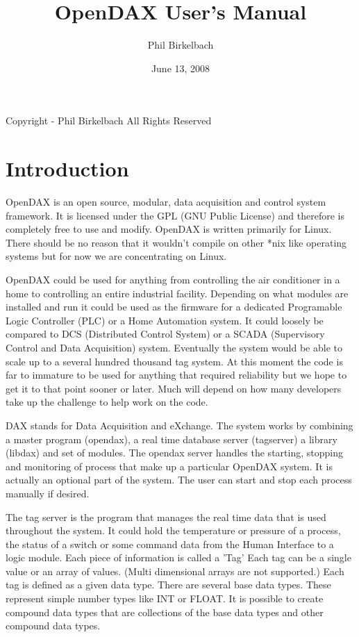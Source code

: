 

\title{OpenDAX User's Manual}
\date{June 13, 2008}
\author{Phil Birkelbach}



\maketitle

\begin{flushleft}
Copyright  - Phil Birkelbach\linebreak
All Rights Reserved
\end{flushleft}

\tableofcontents
\newpage
{}
\chapter{Introduction}
OpenDAX is an open source, modular, data acquisition and control system framework. It is licensed under the GPL (GNU Public License) and therefore is completely free to use and modify. OpenDAX is written primarily for Linux.  There should be no reason that it wouldn't compile on other *nix like operating systems but for now we are concentrating on Linux.

OpenDAX could be used for anything from controlling the air conditioner in a home to controlling an entire industrial facility. Depending on what modules are installed and run it could be used as the firmware for a dedicated Programable Logic Controller (PLC) or a Home Automation system. It could loosely be compared to DCS (Distributed Control System) or a SCADA (Supervisory Control and Data Acquisition) system. Eventually the system would be able to scale up to a several hundred thousand tag system. At this moment the code is far to immature to be used for anything that required reliability but we hope to get it to that point sooner or later. Much will depend on how many developers take up the challenge to help work on the code.

DAX stands for Data Acquisition and eXchange. The system works by combining a master program (opendax), a real time database server (tagserver) a library (libdax) and set of modules. The opendax server handles the starting, stopping and monitoring of process that make up a particular OpenDAX system.  It is actually an optional part of the system.  The user can start and stop each process manually if desired.

The tag server is the program that manages the real time data that is used throughout the system.  It could hold the temperature or pressure of a process, the status of a switch or some command data from the Human Interface to a logic module.  Each piece of information is called a 'Tag'  Each tag can be a single value or an array of values.  (Multi dimensional arrays are not supported.)  Each tag is defined as a given data type.  There are several base data types. These represent simple number types like INT or FLOAT.  It is possible to create compound
data types that are collections of the base data types and other compound data types.

